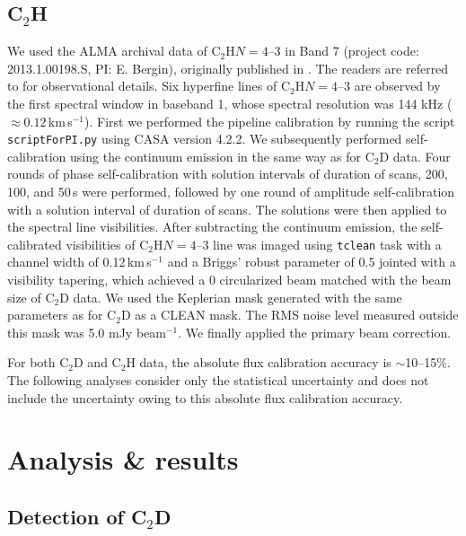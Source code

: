 \documentclass[linenumbers, twocolumn, times]{aastex631}
\newcommand{\CCH}{C$_2$H\xspace}
\newcommand{\CCD}{C$_2$D\xspace}
\begin{document}
\subsection{C$_2$H}
We used the ALMA archival data of \CCH $N=4$--3 in Band 7 (project code: 2013.1.00198.S, PI: E. Bergin), originally published in \citet{Bergin2016}. The readers are referred to \citet{Bergin2016} for observational details. Six hyperfine lines of \CCH $N=4$--3 are observed by the first spectral window in baseband 1, whose spectral resolution was 144 kHz (${\approx}0.12$\,km\,s$^{-1}$). First we performed the pipeline calibration by running the script \texttt{scriptForPI.py} using CASA version 4.2.2. We subsequently performed self-calibration using the continuum emission in the same way as for \CCD data. Four rounds of phase self-calibration with solution intervals of duration of scans, 200, 100, and 50\,s were performed, followed by one round of amplitude self-calibration with a solution interval of duration of scans. The solutions were then applied to the spectral line visibilities. After subtracting the continuum emission, the self-calibrated visibilities of \CCH $N=4$--3 line was imaged using \texttt{tclean} task with a channel width of 0.12\,km\,s$^{-1}$ and a Briggs' robust parameter of 0.5 jointed with a visibility tapering, which achieved a 0 circularized beam matched with the beam size of \CCD data. We used the Keplerian mask generated with the same parameters as for \CCD as a CLEAN mask. The RMS noise level measured outside this mask was 5.0 mJy beam$^{-1}$. We finally applied the primary beam correction.

For both \CCD and \CCH data, the absolute flux calibration accuracy is ${\sim}$10--15\%. The following analyses consider only the statistical uncertainty and does not include the uncertainty owing to this absolute flux calibration accuracy.


\section{Analysis \& results} \label{sec:analysis}

\subsection{Detection of \CCD}
\begin{figure*}
\caption{(a) Velocity-integrated intensity map of \CCH $N=4$--3 lines stacked over all hyperfine transitions. }
\label{fig:abundance_comparison}
\end{figure*}
\end{document}
